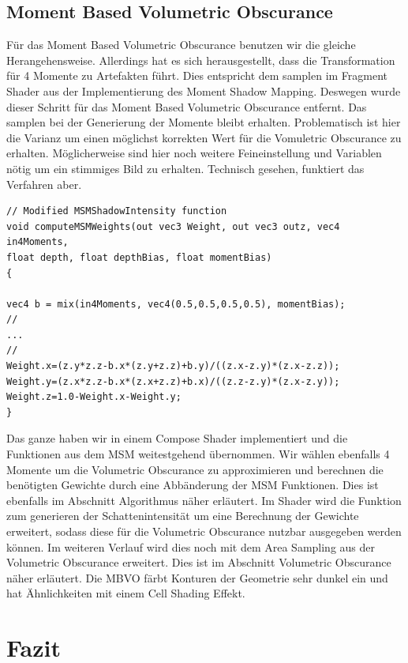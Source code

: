 \documentclass[runningheaders,a4paper]{llncs}
\begin{document}
\subsection{Moment Based Volumetric Obscurance}
Für das Moment Based Volumetric Obscurance benutzen wir die gleiche Herangehensweise. Allerdings hat es sich herausgestellt, dass die Transformation für 4 Momente zu Artefakten führt. Dies entspricht dem samplen im Fragment Shader aus der Implementierung des Moment Shadow Mapping. Deswegen wurde dieser Schritt für das Moment Based Volumetric Obscurance entfernt. Das samplen bei der Generierung der Momente bleibt erhalten. Problematisch ist hier die Varianz um einen möglichst korrekten Wert für die Vomuletric Obscurance zu erhalten. Möglicherweise sind hier noch weitere Feineinstellung und Variablen nötig um ein stimmiges Bild zu erhalten. Technisch gesehen, funktiert das Verfahren aber.
\begin{lstlisting}
// Modified MSMShadowIntensity function
void computeMSMWeights(out vec3 Weight, out vec3 outz, vec4 in4Moments, 
float depth, float depthBias, float momentBias)
{

vec4 b = mix(in4Moments, vec4(0.5,0.5,0.5,0.5), momentBias);
//
...
//
Weight.x=(z.y*z.z-b.x*(z.y+z.z)+b.y)/((z.x-z.y)*(z.x-z.z));
Weight.y=(z.x*z.z-b.x*(z.x+z.z)+b.x)/((z.z-z.y)*(z.x-z.y));
Weight.z=1.0-Weight.x-Weight.y;
}
\end{lstlisting}
Das ganze haben wir in einem Compose Shader implementiert und die Funktionen aus dem MSM weitestgehend übernommen.
Wir wählen ebenfalls 4 Momente um die Volumetric Obscurance zu approximieren und berechnen die benötigten Gewichte durch eine Abbänderung der MSM Funktionen. Dies ist ebenfalls im Abschnitt Algorithmus näher erläutert.
Im Shader wird die Funktion zum generieren der Schattenintensität um eine Berechnung der Gewichte erweitert, sodass diese für die Volumetric Obscurance nutzbar ausgegeben werden können. Im weiteren Verlauf wird dies noch mit dem Area Sampling aus der Volumetric Obscurance erweitert. Dies ist im Abschnitt Volumetric Obscurance näher erläutert.
Die MBVO färbt Konturen der Geometrie sehr dunkel ein und hat Ähnlichkeiten mit einem Cell Shading Effekt.



\section{Fazit}


\end{document}
